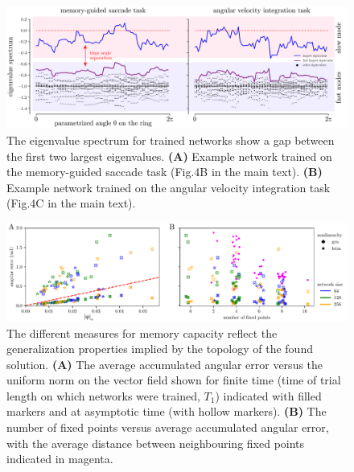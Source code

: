 \documentclass{article}
\begin{document}
\begin{figure}[tbhp]
  \centering
  \includegraphics[width=\textwidth]{eigenvalue_gap}
  \caption{The eigenvalue spectrum for  trained networks  show a gap between the first two largest eigenvalues.
    \textbf{(A)} Example network trained on the memory-guided saccade task (Fig.4B in the main text).
    \textbf{(B)}   Example network trained on the angular velocity integration task (Fig.4C in the main text).
}\label{fig:eigenvalue_gap}
\end{figure}

\begin{figure}[tbhp]
  \centering
  \includegraphics[width=\textwidth]{angular_losses_lstm_gru}
  \caption{The different measures for memory capacity reflect the generalization properties implied by the topology of the found solution.
    \textbf{(A)} The average accumulated angular error versus the uniform norm on the vector field shown for finite time (time of trial length on which networks were trained, \(T_1\)) indicated with filled markers and at asymptotic time (with hollow markers).
    \textbf{(B)}   The number of fixed points versus average accumulated angular error, with the average distance between neighbouring fixed points indicated in magenta.
}\label{fig:angular_losses_lstm_gru}
\end{figure}
\end{document}
